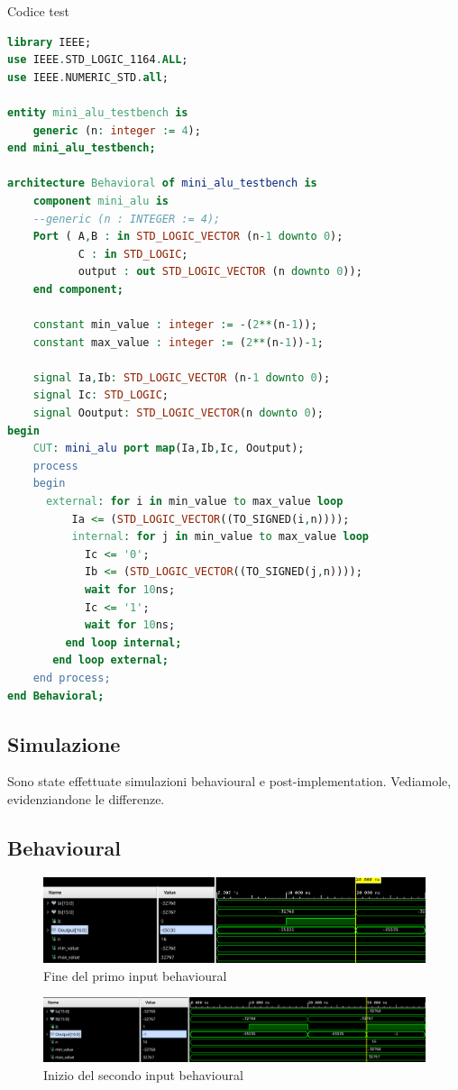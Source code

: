 \begin{problem}{Codice test}{}
\begin{lstlisting}[language=VHDL]
library IEEE;
use IEEE.STD_LOGIC_1164.ALL;
use IEEE.NUMERIC_STD.all;

entity mini_alu_testbench is
    generic (n: integer := 4);
end mini_alu_testbench;

architecture Behavioral of mini_alu_testbench is
    component mini_alu is
    --generic (n : INTEGER := 4);
    Port ( A,B : in STD_LOGIC_VECTOR (n-1 downto 0);
           C : in STD_LOGIC;
           output : out STD_LOGIC_VECTOR (n downto 0));
    end component;
    
    constant min_value : integer := -(2**(n-1));
    constant max_value : integer := (2**(n-1))-1;

    signal Ia,Ib: STD_LOGIC_VECTOR (n-1 downto 0);
    signal Ic: STD_LOGIC;
    signal Ooutput: STD_LOGIC_VECTOR(n downto 0);
begin 
    CUT: mini_alu port map(Ia,Ib,Ic, Ooutput);
    process 
    begin
      external: for i in min_value to max_value loop
          Ia <= (STD_LOGIC_VECTOR((TO_SIGNED(i,n))));
          internal: for j in min_value to max_value loop
            Ic <= '0';
            Ib <= (STD_LOGIC_VECTOR((TO_SIGNED(j,n))));
            wait for 10ns;
            Ic <= '1';
            wait for 10ns;
         end loop internal;
       end loop external;   
    end process;
end Behavioral;
\end{lstlisting}
\end{problem}

\subsection{Simulazione}
Sono state effettuate simulazioni behavioural e post-implementation. Vediamole, evidenziandone le differenze.
\subsection{Behavioural}
\begin{figure}[h]
      \centering
      \includegraphics[width=1\textwidth]{assets/simulations/behavioural/16bit/end_first_ooutput_16bit_behav.png}
      \caption{Fine del primo input behavioural}
\end{figure}
\begin{figure}[h]
      \centering
      \includegraphics[width=1\textwidth]{assets/simulations/behavioural/16bit/start_secont_ooutput_16_bit_behav.png}
      \caption{Inizio del secondo input behavioural}
\end{figure}


